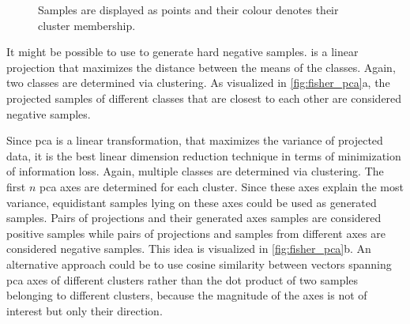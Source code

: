 \begin{figure}[!htb]%
    \centering
    \qquad
    \caption{Samples are displayed as points and their colour denotes their cluster membership.}%
    \label{fig:fisher_pca}%
\end{figure}

It might be possible to use \fisher{} to generate hard negative samples.
\fisher{} is a linear projection that maximizes the distance between the means of the classes.
Again, two classes are determined via clustering.
As visualized in \autoref{fig:fisher_pca}a, the projected samples of different classes that 
are closest to each other are considered negative samples.

Since \ac{pca} is a linear transformation, that maximizes the variance of projected data, 
it is the best linear dimension reduction technique in terms of minimization of information loss.
Again, multiple classes are determined via clustering.
The first $n$ \ac{pca} axes are determined for each cluster.
Since these axes explain the most variance, equidistant samples lying on these axes could be used as generated samples.
Pairs of projections and their generated axes samples are considered positive samples while 
pairs of projections and samples from different axes are considered negative samples.
This idea is visualized in \autoref{fig:fisher_pca}b.
An alternative approach could be to use cosine similarity between vectors spanning \ac{pca} axes of different clusters 
rather than the dot product of two samples belonging to different clusters, 
because the magnitude of the axes is not of interest but only their direction.

